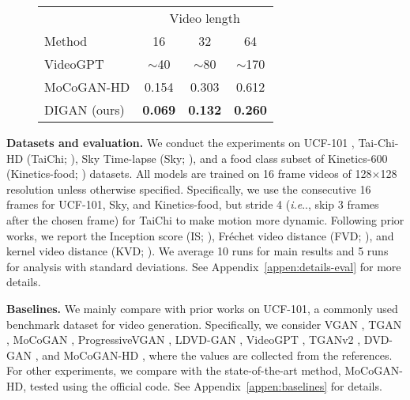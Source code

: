 \documentclass{article} \usepackage{iclr2022_conference,times}
\makeatletter
\DeclareRobustCommand\onedot{\futurelet\@let@token\@onedot}
\def\@onedot{\ifx\@let@token.\else.\null\fi\xspace}
\def\ie{\emph{i.e}\onedot} \def\Ie{\emph{I.e}\onedot}
\makeatother
\begin{document}
\begin{figure*}[t]
\begin{minipage}{0.46\textwidth}
{}\label{tab:fast}
\vspace{-0.1in}
\begin{tabular}{lccc}
\toprule
 & \multicolumn{3}{c}{Video length}  \\
\cmidrule(lr){2-4}
Method & 16 & 32 & 64 \\
\midrule
VideoGPT     & $\sim$40 & $\sim$80 & $\sim$170 \\
MoCoGAN-HD   & 0.154 & 0.303 & 0.612 \\
DIGAN (ours) & \textbf{0.069} & \textbf{0.132} & \textbf{0.260} \\
\bottomrule
\end{tabular}
\end{minipage}
\vspace{-0.1in}
\end{figure*}


 
\textbf{Datasets and evaluation.} 
We conduct the experiments on UCF-101 \citep{soomro2012ucf101}, Tai-Chi-HD (TaiChi; \citet{siarohin2019first}), Sky Time-lapse (Sky; \citet{xiong2018learning}), and a food class subset of Kinetics-600 (Kinetics-food; \citet{carreira2018short}) datasets. All models are trained on 16 frame videos of 128$\times$128 resolution unless otherwise specified. 
Specifically, we use the consecutive 16 frames for UCF-101, Sky, and Kinetics-food, but stride 4 (\ie, skip 3 frames after the chosen frame) for TaiChi to make motion more dynamic. 
Following prior works, we report the Inception score (IS; \citet{salimans2016improved}), Fr\'echet video distance (FVD; \citet{unterthiner2018towards}), and kernel video distance (KVD; \citet{unterthiner2018towards}). We average 10 runs for main results and 5 runs for analysis with standard deviations. See Appendix~\ref{appen:details-eval} for more details.

\textbf{Baselines.}
We mainly compare \sname with prior works on UCF-101, a commonly used benchmark dataset for video generation. Specifically, we consider VGAN \citep{vondrick2016generating}, TGAN \citep{saito2017temporal}, MoCoGAN \citep{tulyakov2018mocogan}, ProgressiveVGAN \citep{acharya2018towards}, LDVD-GAN \citep{kahembwe2020lower}, VideoGPT \citep{yan2021videogpt}, TGANv2 \citep{saito2020train}, DVD-GAN \citep{clark2019adversarial}, and MoCoGAN-HD \citep{tian2021good}, where the values are collected from the references. For other experiments, we compare \sname with the state-of-the-art method, MoCoGAN-HD, tested using the official code. See Appendix~\ref{appen:baselines} for details.
\end{document}
